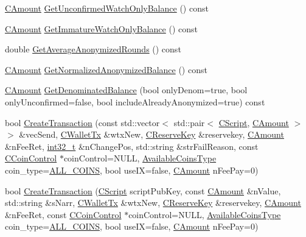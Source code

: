 \begin{DoxyCompactItemize}
\item 
\hyperlink{amount_8h_a4eaf3a5239714d8c45b851527f7cb564}{C\+Amount} \hyperlink{class_c_wallet_a639be9d778aeeb8b71aa653f0089cdff}{Get\+Unconfirmed\+Watch\+Only\+Balance} () const 
\item 
\hyperlink{amount_8h_a4eaf3a5239714d8c45b851527f7cb564}{C\+Amount} \hyperlink{class_c_wallet_a9ab28b6ff93197c89af4a69dc1117e44}{Get\+Immature\+Watch\+Only\+Balance} () const 
\item 
double \hyperlink{class_c_wallet_ab2440e827d25edcd5a98d6113601088c}{Get\+Average\+Anonymized\+Rounds} () const 
\item 
\hyperlink{amount_8h_a4eaf3a5239714d8c45b851527f7cb564}{C\+Amount} \hyperlink{class_c_wallet_aef7643cab406b179cdddb615cd5f26cf}{Get\+Normalized\+Anonymized\+Balance} () const 
\item 
\hyperlink{amount_8h_a4eaf3a5239714d8c45b851527f7cb564}{C\+Amount} \hyperlink{class_c_wallet_aef59875cbecc432c85215334245f490b}{Get\+Denominated\+Balance} (bool only\+Denom=true, bool only\+Unconfirmed=false, bool include\+Already\+Anonymized=true) const 
\item 
bool \hyperlink{class_c_wallet_a98bcc563b7598ac652d39f091a38e418}{Create\+Transaction} (const std\+::vector$<$ std\+::pair$<$ \hyperlink{class_c_script}{C\+Script}, \hyperlink{amount_8h_a4eaf3a5239714d8c45b851527f7cb564}{C\+Amount} $>$ $>$ \&vec\+Send, \hyperlink{class_c_wallet_tx}{C\+Wallet\+Tx} \&wtx\+New, \hyperlink{class_c_reserve_key}{C\+Reserve\+Key} \&reservekey, \hyperlink{amount_8h_a4eaf3a5239714d8c45b851527f7cb564}{C\+Amount} \&n\+Fee\+Ret, \hyperlink{stdint_8h_ab1967d8591af1a4e48c37fd2b0f184d0}{int32\+\_\+t} \&n\+Change\+Pos, std\+::string \&str\+Fail\+Reason, const \hyperlink{class_c_coin_control}{C\+Coin\+Control} $\ast$coin\+Control=N\+U\+L\+L, \hyperlink{wallet_8h_a90b09b05f289ac32704a6446a94566ce}{Available\+Coins\+Type} coin\+\_\+type=\hyperlink{wallet_8h_a90b09b05f289ac32704a6446a94566cea94cc8a0e81d9490cdbdfc3d3f215e9e7}{A\+L\+L\+\_\+\+C\+O\+I\+N\+S}, bool use\+I\+X=false, \hyperlink{amount_8h_a4eaf3a5239714d8c45b851527f7cb564}{C\+Amount} n\+Fee\+Pay=0)
\item 
bool \hyperlink{class_c_wallet_a9fc87acaec36712ad1f5f01cf255984b}{Create\+Transaction} (\hyperlink{class_c_script}{C\+Script} script\+Pub\+Key, const \hyperlink{amount_8h_a4eaf3a5239714d8c45b851527f7cb564}{C\+Amount} \&n\+Value, std\+::string \&s\+Narr, \hyperlink{class_c_wallet_tx}{C\+Wallet\+Tx} \&wtx\+New, \hyperlink{class_c_reserve_key}{C\+Reserve\+Key} \&reservekey, \hyperlink{amount_8h_a4eaf3a5239714d8c45b851527f7cb564}{C\+Amount} \&n\+Fee\+Ret, const \hyperlink{class_c_coin_control}{C\+Coin\+Control} $\ast$coin\+Control=N\+U\+L\+L, \hyperlink{wallet_8h_a90b09b05f289ac32704a6446a94566ce}{Available\+Coins\+Type} coin\+\_\+type=\hyperlink{wallet_8h_a90b09b05f289ac32704a6446a94566cea94cc8a0e81d9490cdbdfc3d3f215e9e7}{A\+L\+L\+\_\+\+C\+O\+I\+N\+S}, bool use\+I\+X=false, \hyperlink{amount_8h_a4eaf3a5239714d8c45b851527f7cb564}{C\+Amount} n\+Fee\+Pay=0)

\end{DoxyCompactItemize}
